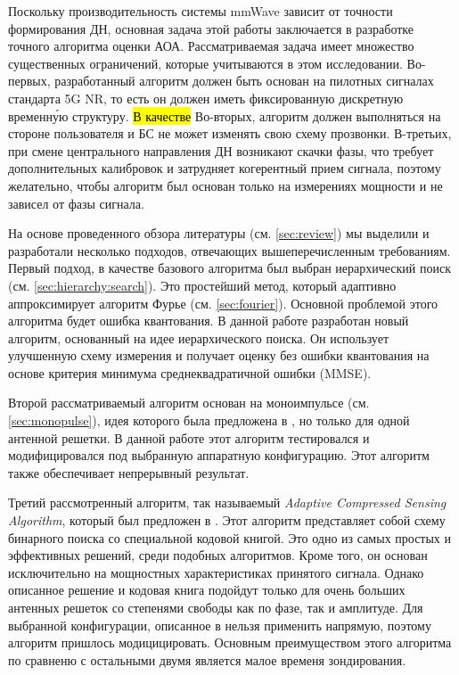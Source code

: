 Поскольку производительность системы mmWave зависит от точности формирования ДН,
основная задача этой работы заключается в разработке точного алгоритма оценки
АОА. Рассматриваемая задача имеет множество существенных ограничений, которые
учитываются в этом исследовании.  Во-первых, разработанный алгоритм должен быть
основан на пилотных сигналах стандарта 5G NR, то есть он должен иметь
фиксированную дискретную временн\'{у}ю структуру. \hl{В качестве } Во-вторых,
алгоритм должен выполняться на стороне пользователя и БС не может изменять свою
схему прозвонки.  В-третьих, при смене центрального направления ДН возникают
скачки фазы, что требует дополнительных калибровок и затрудняет когерентный
прием сигнала, поэтому желательно, чтобы алгоритм был основан только на
измерениях мощности и не зависел от фазы сигнала.

На основе проведенного обзора литературы (см. \ref{sec:review}) мы выделили и
разработали несколько подходов, отвечающих вышеперечисленным требованиям. Первый
подход, в качестве базового алгоритма был выбран иерархический поиск (см.
\ref{sec:hierarchy:search}).  Это простейший метод, который адаптивно
аппроксимирует алгоритм Фурье (см. \ref{sec:fourier}).  Основной проблемой этого
алгоритма будет ошибка квантования.  В данной работе разработан новый алгоритм,
основанный на идее иерархического поиска.  Он использует улучшенную схему
измерения и получает оценку без ошибки квантования на основе критерия
минимума среднеквадратичной ошибки (MMSE).

Второй рассматриваемый алгоритм основан на моноимпульсе (см.
\ref{sec:monopulse}), идея которого была предложена в \cite{Zhu2016, Kim2019},
но только для одной антенной решетки. В данной работе этот алгоритм тестировался
и модифицировался под выбранную аппаратную конфигурацию.  Этот алгоритм также
обеспечивает непрерывный результат.

Третий рассмотренный алгоритм, так называемый \textit{Adaptive Compressed
Sensing Algorithm}, который был предложен в \cite{Alkhateeb2014}.  Этот алгоритм
представляет собой схему бинарного поиска со специальной кодовой книгой. Это
одно из самых простых и эффективных решений, среди подобных алгоритмов.  Кроме
того, он основан исключительно на мощностных характеристиках принятого сигнала.
Однако описанное решение и кодовая книга подойдут только для очень больших
антенных решеток со степенями свободы как по фазе, так и амплитуде. Для
выбранной конфигурации, описанное в \cite{Alkhateeb2014} нельзя применить
напрямую, поэтому алгоритм пришлось модицицировать.  Основным преимуществом
этого алгоритма по сравненю с остальными двумя является малое временя зондирования.

